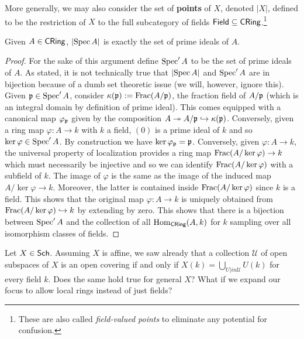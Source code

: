 \documentclass[11pt]{article}
\renewcommand{\phi}{\varphi}
\newcommand{\U}{\mathscr{U}}
\begin{document}
More generally, we may also consider the set of \textbf{points} of $X$, denoted $|X|$, defined to be the restriction of $X$ to the full subcategory of fields $\operatorname{\mathsf{Field}}\subseteq\operatorname{\mathsf{CRing}}$.\footnote{These are also called \emph{field-valued points} to eliminate any potential for confusion.}

\begin{proposition}
Given $A\in\operatorname{\mathsf{CRing}}$, $\left\lvert\operatorname{Spec} A\right\rvert$ is exactly the set of prime ideals of $A$.
\end{proposition}

\begin{proof}
For the sake of this argument define $\operatorname{Spec}'A$ to be the set of prime ideals of $A$. As stated, it is not technically true that $\left\lvert\operatorname{Spec} A\right\rvert$ and $\operatorname{Spec}'A$ are in bijection because of a dumb set theoretic issue (we will, however, ignore this). Given $\mathfrak{p}\in\operatorname{Spec}'A$, consider $\kappa(\mathfrak{p}):=\operatorname{Frac}(A/\mathfrak{p})$, the fraction field of $A/\mathfrak{p}$ (which is an integral domain by definition of prime ideal). This comes equipped with a canonical map $\phi_{\mf{p}}$ given by the composition $A\twoheadrightarrow A/\mathfrak{p}\hookrightarrow\kappa(\mathfrak{p})$. Conversely, given a ring map $\phi: A\to k$ with $k$ a field, $(0)$ is a prime ideal of $k$ and so $\ker\phi\in\Spec'A$. By construction we have $\ker\phi_{\mf{p}}=\mf{p}$. Conversely, given $\phi: A\to k$, the universal property of localization provides a ring map $\Frac(A/\ker\phi)\to k$ which must necessarily be injective and so we can identify $\Frac(A/\ker\phi)$ with a subfield of $k$. The image of $\phi$ is the same as the image of the induced map $A/\ker\phi\to k$. Moreover, the latter is contained inside $\Frac(A/\ker\phi)$ since $k$ is a field. This shows that the original map $\phi: A\to k$ is uniquely obtained from $\Frac(A/\ker\phi)\inj k$ by extending by zero. This shows that there is a bijection between $\operatorname{Spec}'A$ and the collection of all $\operatorname{Hom}_{\operatorname{\mathsf{CRing}}}(A,k)$ for $k$ sampling over all isomorphism classes of fields.
\end{proof}

\begin{exercise}
Let $X\in\operatorname{\mathsf{Sch}}$. Assuming $X$ is affine, we saw already that a collection $\U$ of open subspaces of $X$ is an open covering if and only if $X(k)=\bigcup_{U|in\U}U(k)$ for every field $k$. Does the same hold true for general $X$? What if we expand our focus to allow local rings instead of just fields?
\end{exercise}
\end{document}
